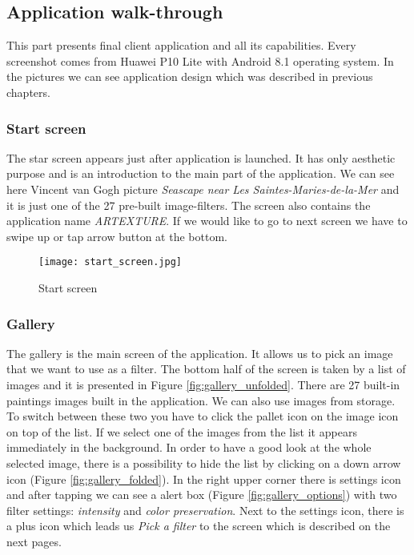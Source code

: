 \documentclass[../Main.tex]{subfiles}
\begin{document}
\newpage
\subsection{Application walk-through}
This part presents final client application and all its capabilities.
Every screenshot comes from Huawei P10 Lite with Android 8.1 operating system. In the pictures we can see application design which was described in previous chapters.

\subsubsection{Start screen}
The star screen appears just after application is launched. It has only aesthetic purpose and is an introduction to the main part of the application. We can see here Vincent van Gogh picture \textit{Seascape near Les Saintes-Maries-de-la-Mer} and it is just one of the 27 pre-built image-filters. The screen also contains the application name \textit{ARTEXTURE}. If we would like to go to next screen we have to swipe up or tap arrow button at the bottom.


\begin{figure}[H]
    \centering
    \texttt{[image: start\_screen.jpg]}
    \caption{Start screen}
    \label{fig:start-screen}
\end{figure}


\subsubsection{Gallery}
The gallery is the main screen of the application. It allows us to pick an image 
that we want to use as a filter. The bottom half of the screen is taken by a list of images and it is presented in Figure \ref{fig:gallery_unfolded}.
There are 27 built-in paintings images built in the application. We can also use images from storage.
To switch between these two you have to click the pallet icon on the image icon on top of the list.
If we select one of the images from the list it appears immediately in the background.
In order to have a good look at the whole selected image, there is a possibility 
to hide the list by clicking on a down arrow icon (Figure \ref{fig:gallery_folded}).
In the right upper corner there is settings icon and after tapping we can see a 
alert box (Figure \ref{fig:gallery_options}) with two filter settings:
\textit{intensity} and \textit{color preservation}.
Next to the settings icon, there is a plus icon which leads us \textit{Pick a filter} 
to the screen which is described on the next pages.
\end{document}
